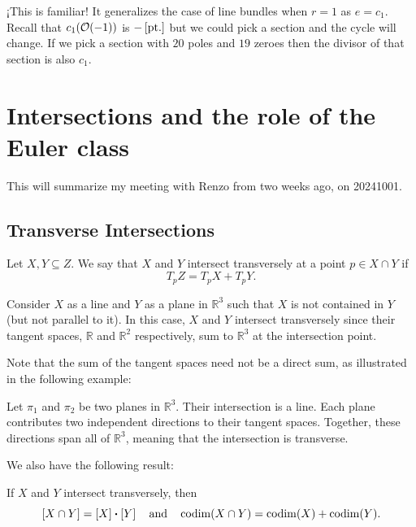 \documentclass[12pt]{memoir}
\begin{document}
\begin{Rmk}
    ¡This is familiar! It generalizes the case of line bundles when $r=1$ as $e=c_1$. Recall that $c_1(\mathcal{O}(-1))$ is $-\left\lbrack\text{pt}.\right\rbrack$ but we could pick a section and the cycle will change. If we pick a section with $20$ poles and $19$ zeroes then the divisor of that section is also $c_1$.
\end{Rmk}

\section{Intersections and the role of the Euler class}

This will summarize my meeting with Renzo from two weeks ago, on 20241001.

\subsection{Transverse Intersections}

\begin{Def}
    Let $X, Y \subseteq Z$. We say that $X$ and $Y$ intersect transversely at a point $p \in X \cap Y$ if 
    \[
    T_p Z = T_p X + T_p Y.
    \]
\end{Def}

\begin{Ex}
    Consider $X$ as a line and $Y$ as a plane in $\mathbb{R}^3$ such that $X$ is not contained in $Y$ (but not parallel to it). In this case, $X$ and $Y$ intersect transversely since their tangent spaces, $\mathbb{R}$ and $\mathbb{R}^2$ respectively, sum to $\mathbb{R}^3$ at the intersection point.
\end{Ex}

Note that the sum of the tangent spaces need not be a direct sum, as illustrated in the following example:

\begin{Ex}
    Let $\pi_1$ and $\pi_2$ be two planes in $\mathbb{R}^3$. Their intersection is a line. Each plane contributes two independent directions to their tangent spaces. Together, these directions span all of $\mathbb{R}^3$, meaning that the intersection is transverse.
\end{Ex}

We also have the following result:

\begin{Prop}
    If $X$ and $Y$ intersect transversely, then
    \[
    \bonj{X \cap Y} = \bonj{X} \. \bonj{Y} \quad \text{and} \quad \codim(X \cap Y) = \codim(X) + \codim(Y).
    \]
\end{Prop}
\end{document}
